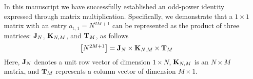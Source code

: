 In this manuscript we have successfully established an odd-power
identity expressed through matrix multiplication.
Specifically, we demonstrate that a \(1 \times 1\) matrix with an entry \(a_{1,1} = N^{2M+1}\)
can be represented as the product of three matrices: \({\mathbf{J}} \sb{N}\),
\({\mathbf{K}} \sb{N, M}\), and \({\mathbf{T}} \sb{M}\), as follows
\[
    \begin{bmatrix}
        N^{2M+1}
    \end{bmatrix} = {\mathbf{J}} \sb{N} \times {\mathbf{K}} \sb{N, M} \times {\mathbf{T}} \sb{M}
\]
Here, \({\mathbf{J}} \sb{N}\) denotes a unit row vector of dimension \(1 \times N\), \({\mathbf{K}} \sb{N, M}\)
is an \(N \times M\) matrix,
and \({\mathbf{T}} \sb{M}\) represents a column vector of dimension \(M \times 1\).
